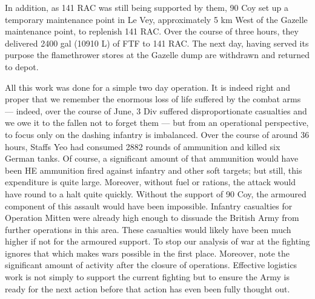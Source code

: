 \documentclass[noraggedright]{turabian-researchpaper}
\begin{document}

In addition, as 141 RAC was still being supported by them, 90 Coy set up a 
temporary maintenance point in Le Vey, approximately 5 km West of the Gazelle 
maintenance point, to replenish 141 RAC.  Over the course of three hours, 
they delivered 2400 gal (10910 L) of FTF to 141 RAC.  The next day, having 
served its purpose the flamethrower stores at the Gazelle dump are withdrawn 
and returned to depot.\autocite[28 -- 29 June 1944]
{90wd} %

All this work was done for a simple two day operation. It is indeed right
and proper that we remember the enormous loss of life suffered by the combat
arms --- indeed, over the course of June, 3 Div suffered disproportionate 
casualties and we owe it to the fallen not to forget them --- but from an 
operational perspective, to focus only on the dashing infantry is 
imbalanced.\autocite[112]{assault-div} Over the course of around 36 hours, 
Staffs Yeo had consumed 2882 rounds of ammunition and killed six German
tanks.\autocites[June appendix, Operation Mitten Intelligence Diary, Entry 58]
{27wd}[on ammunition expenditure, 27-8 June 1944]{90wd}  Of course, a 
significant amount of that ammunition would have been HE ammunition fired 
against infantry and other soft targets; but still, this expenditure is quite 
large.  Moreover, without fuel or rations, the attack would have round to a 
halt quite quickly.  Without the support of 90 Coy, the armoured component of 
this assault would have been impossible.  Infantry casualties for Operation 
Mitten were already high enough to dissuade the British Army from further 
operations in this area.\autocite[111-2]{assault-div} These casualties would 
likely have been much higher if not for the armoured support.  To stop our 
analysis of war at the fighting ignores that which makes wars possible in 
the first place.  Moreover, note the significant amount of activity after the 
closure of operations.  Effective logistics work is not simply to support the 
current fighting but to ensure the Army is ready for the next action before 
that action has even been fully thought out.%



\end{document}
